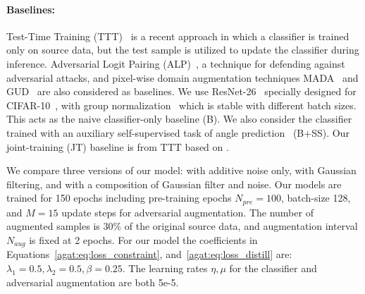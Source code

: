    \paragraph{Baselines:}
    Test-Time Training (TTT)~\citep{sun2020test} is a recent approach in which a classifier is trained only on source data, but the test sample is utilized to update the classifier during inference.
    Adversarial Logit Pairing (ALP)~\citep{kannan2018adversarial}, a technique for defending against adversarial attacks, and pixel-wise domain augmentation techniques MADA~\citep{qiao2020learning} and GUD~\citep{volpi2018generalizing} are also considered as baselines.
    We use ResNet-26~\citep{he2016deep} specially designed for CIFAR-10~\citep{russakovsky2015imagenet}, with group normalization~\citep{wu2018group} which is stable with different batch sizes.
    This acts as the naive classifier-only baseline (B).
    We also consider the classifier trained with an auxiliary self-supervised task of angle prediction~\citep{gidaris2018unsupervised} (B+SS).
    Our joint-training (JT) baseline is from TTT based on \citep{hendrycks2018benchmarking}.

    We compare three versions of our model: with additive noise only, with Gaussian filtering, and with a composition of Gaussian filter and noise. 
    Our models are trained for 150 epochs including pre-training epochs $N_{pre}\mathrm{=}100$, batch-size 128, and $M\mathrm{=}15$ update steps for adversarial augmentation.
    The number of augmented samples is $30\%$ of the original source data, and augmentation interval $N_{aug}$ is fixed at 2 epochs.
    For our model the coefficients in Equations~\ref{agat:eq:loss_constraint}, and~\ref{agat:eq:loss_distill} are: $\lambda_1=0.5, \lambda_2=0.5, \beta=0.25$.
    The learning rates $\eta, \mu$ for the classifier and adversarial augmentation are both 5e-5.

